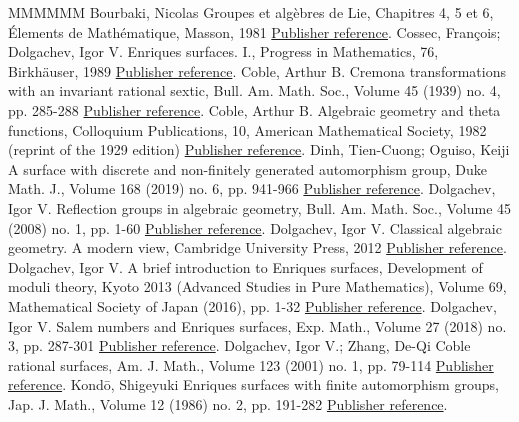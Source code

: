 \begin{thebibliography}{MMMMMM}
 Bourbaki, Nicolas Groupes et algèbres de Lie, Chapitres 4, 5 et 6, Élements de Mathématique, Masson, 1981 \href{https://ahl.centre-mersenne.org/item/AHL_2020__3__1133_0/#Bourbaki}{Publisher reference}.
 Cossec, François; Dolgachev, Igor V. Enriques surfaces. I., Progress in Mathematics, 76, Birkhäuser, 1989 \href{https://ahl.centre-mersenne.org/item/AHL_2020__3__1133_0/#CossecDolgachev}{Publisher reference}.
 Coble, Arthur B. Cremona transformations with an invariant rational sextic, Bull. Am. Math. Soc., Volume 45 (1939) no. 4, pp. 285-288 \href{https://ahl.centre-mersenne.org/item/AHL_2020__3__1133_0/#Coble2}{Publisher reference}.
 Coble, Arthur B. Algebraic geometry and theta functions, Colloquium Publications, 10, American Mathematical Society, 1982 (reprint of the 1929 edition) \href{https://ahl.centre-mersenne.org/item/AHL_2020__3__1133_0/#Coble}{Publisher reference}.
 Dinh, Tien-Cuong; Oguiso, Keiji A surface with discrete and non-finitely generated automorphism group, Duke Math. J., Volume 168 (2019) no. 6, pp. 941-966 \href{https://ahl.centre-mersenne.org/item/AHL_2020__3__1133_0/#Oguiso}{Publisher reference}.
 Dolgachev, Igor V. Reflection groups in algebraic geometry, Bull. Am. Math. Soc., Volume 45 (2008) no. 1, pp. 1-60 \href{https://ahl.centre-mersenne.org/item/AHL_2020__3__1133_0/#DolgachevBulletin}{Publisher reference}.
 Dolgachev, Igor V. Classical algebraic geometry. A modern view, Cambridge University Press, 2012 \href{https://ahl.centre-mersenne.org/item/AHL_2020__3__1133_0/#CAG}{Publisher reference}.
 Dolgachev, Igor V. A brief introduction to Enriques surfaces, Development of moduli theory, Kyoto 2013 (Advanced Studies in Pure Mathematics), Volume 69, Mathematical Society of Japan (2016), pp. 1-32 \href{https://ahl.centre-mersenne.org/item/AHL_2020__3__1133_0/#DolgachevBrief}{Publisher reference}.
 Dolgachev, Igor V. Salem numbers and Enriques surfaces, Exp. Math., Volume 27 (2018) no. 3, pp. 287-301 \href{https://ahl.centre-mersenne.org/item/AHL_2020__3__1133_0/#DolgachevSalem}{Publisher reference}.
 Dolgachev, Igor V.; Zhang, De-Qi Coble rational surfaces, Am. J. Math., Volume 123 (2001) no. 1, pp. 79-114 \href{https://ahl.centre-mersenne.org/item/AHL_2020__3__1133_0/#DZ}{Publisher reference}.
 Kondō, Shigeyuki Enriques surfaces with finite automorphism groups, Jap. J. Math., Volume 12 (1986) no. 2, pp. 191-282 \href{https://ahl.centre-mersenne.org/item/AHL_2020__3__1133_0/#Kondo}{Publisher reference}.

\end{thebibliography}
